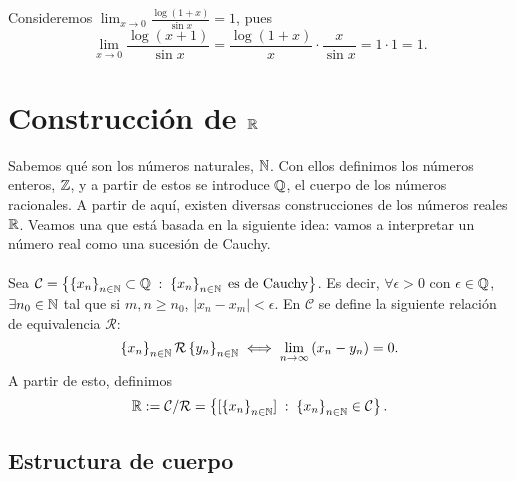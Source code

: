 \begin{eg}
\normalfont Consideremos $\displaystyle \lim_{x \to 0} \frac{\log\left(1+x\right)}{\sin x} = 1 $, pues
\[\lim_{x \to 0}\frac{\log\left(x+1\right)}{\sin x} = \frac{\log\left(1+x\right)}{x} \cdot \frac{x}{\sin x} = 1 \cdot 1 = 1 .\]
\end{eg}

\chapter{Construcción de $\displaystyle \mathbb{R} $}

Sabemos qué son los números naturales, $\displaystyle \mathbb{N} $. Con ellos definimos los números enteros, $\displaystyle \mathbb{Z} $, y a partir de estos se introduce $\displaystyle \mathbb{Q} $, el cuerpo de los números racionales. A partir de aquí, existen diversas construcciones de los números reales $\displaystyle \mathbb{R} $. Veamos una que está basada en la siguiente idea: vamos a interpretar un número real como una sucesión de Cauchy. \\ \\
Sea $\displaystyle \mathcal{C} = \left\{ \left\{ x_{n}\right\} _{n\in\mathbb{N}}\subset\mathbb{Q}\; : \; \left\{ x_{n}\right\} _{n\in\mathbb{N}} \; \text{es de Cauchy}\right\}  $. Es decir, $\displaystyle \forall \epsilon > 0 $  con $\displaystyle \epsilon \in \mathbb{Q} $, $\displaystyle \exists n_{0} \in \mathbb{N} $ tal que si $\displaystyle m, n \geq n_{0} $, $\displaystyle \left|x_{n}-x_{m}\right|<\epsilon  $. En $\displaystyle \mathcal{C} $ se define la siguiente relación de equivalencia $\displaystyle \mathcal{R} $:
\[ \left\{ x_{n}\right\} _{n\in\mathbb{N}} \mathcal{R} \left\{ y_{n}\right\} _{n\in\mathbb{N}} \iff \lim_{n \to \infty}\left(x_{n}-y_{n}\right)= 0 .\]
A partir de esto, definimos 
\[\mathbb{R}:= \mathcal{C}/\mathcal{R} = \left\{ [ \left\{ x_{n}\right\} _{n\in\mathbb{N}}] \; : \; \left\{ x_{n}\right\} _{n\in\mathbb{N}}\in\mathcal{C}\right\}  .\]

\section{Estructura de cuerpo}

